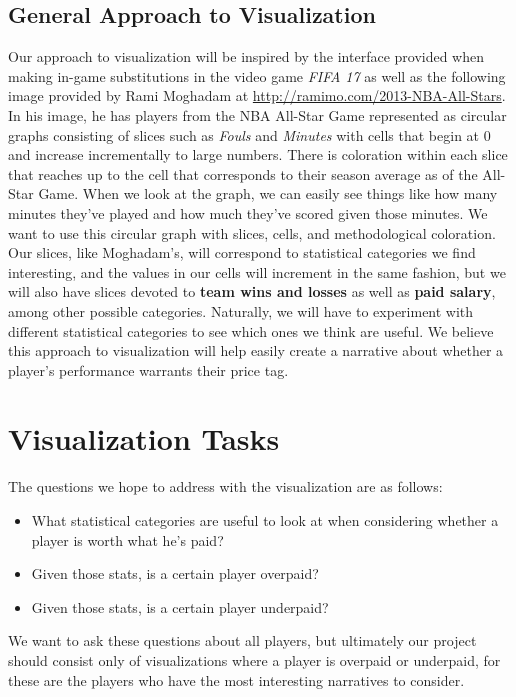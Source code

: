 \documentclass[journal]{vgtc}                %
\begin{document}
\subsection{General Approach to Visualization}
Our approach to visualization will be inspired by the interface provided when making in-game substitutions in the video game \emph{FIFA 17} as well as the following image provided by Rami Moghadam at \url{http://ramimo.com/2013-NBA-All-Stars}. In his image, he has players from the NBA All-Star Game represented as circular graphs consisting of slices such as \emph{Fouls} and \emph{Minutes} with cells that begin at 0 and increase incrementally to large numbers. There is coloration within each slice that reaches up to the cell that corresponds to their season average as of the All-Star Game. When we look at the graph, we can easily see things like how many minutes they've played and how much they've scored given those minutes. We want to use this circular graph with slices, cells, and methodological coloration. Our slices, like Moghadam's, will correspond to statistical categories we find interesting, and the values in our cells will increment in the same fashion, but we will also have slices devoted to \textbf{team wins and losses} as well as \textbf{paid salary}, among other possible categories. Naturally, we will have to experiment with different statistical categories to see which ones we think are useful. We believe this approach to visualization will help easily create a narrative about whether a player's performance warrants their price tag.

\section{Visualization Tasks}
The questions we hope to address with the visualization are as follows:
\begin{itemize}
\item What statistical categories are useful to look at when considering whether a player is worth what he's paid?
\item Given those stats, is a certain player overpaid?
\item Given those stats, is a certain player underpaid?
\end{itemize}

We want to ask these questions about all players, but ultimately our project should consist only of visualizations where a player is overpaid or underpaid, for these are the players who have the most interesting narratives to consider.
\end{document}
